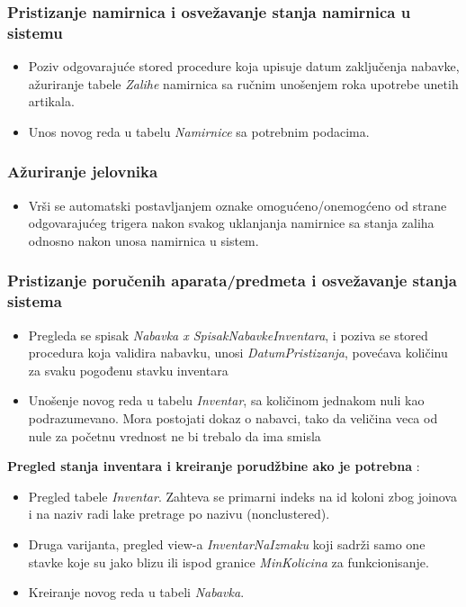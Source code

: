 \documentclass{article}
\begin{document}
\subsubsection{Pristizanje namirnica i osvežavanje stanja namirnica u sistemu}
\begin{itemize}
\item Poziv odgovarajuće stored procedure koja upisuje datum zaključenja nabavke, ažuriranje tabele \emph{Zalihe} namirnica sa ručnim unošenjem roka upotrebe unetih artikala.
\item Unos novog reda u tabelu \emph{Namirnice} sa potrebnim podacima.
\end{itemize}

\subsubsection{Ažuriranje jelovnika}
\begin{itemize}
\item Vrši se automatski postavljanjem oznake omogućeno/onemogćeno od strane odgovarajućeg trigera nakon svakog uklanjanja namirnice sa stanja zaliha odnosno nakon unosa namirnica u sistem.
\end{itemize}


\subsubsection{Pristizanje poručenih aparata/predmeta i osvežavanje stanja sistema}
\begin{itemize}
\item Pregleda se spisak \emph{Nabavka x SpisakNabavkeInventara}, i poziva se stored procedura koja validira nabavku, unosi \emph{DatumPristizanja}, povećava količinu za svaku pogođenu stavku inventara 
\item Unošenje novog reda u tabelu \emph{Inventar}, sa količinom jednakom nuli kao podrazumevano. Mora postojati dokaz o nabavci, tako da veličina veca od nule za početnu vrednost ne bi trebalo da ima smisla
\end{itemize}

\textbf{Pregled stanja inventara i kreiranje porudžbine ako je potrebna} :
\begin{itemize}
\item Pregled tabele \emph{Inventar}. Zahteva se primarni indeks na id koloni zbog joinova i na naziv radi lake pretrage po nazivu (nonclustered).
\item Druga varijanta, pregled view-a \emph{InventarNaIzmaku} koji sadrži samo one stavke koje su jako blizu ili ispod granice \emph{MinKolicina} za funkcionisanje.
\item Kreiranje novog reda u tabeli \emph{Nabavka}.
\end{itemize}
\end{document}
